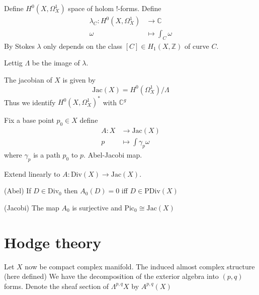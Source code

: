 Define $H^0 ( X, \Omega_X ^ 1) $ space of holom !-forms.
Define 
\begin{align}
    \lambda _ C : H^0 ( X, \Omega_X ^1 ) & \rightarrow  \mathbb{C} \\
    \omega & \mapsto \int _C \omega
\end{align}
By Stokes $\lambda$ only depends on the class $[C] \in H_1 (X, \mathbb{Z} ) $ of curve $C$. 

Lettig $ \Lambda$ be the image of $\lambda$.

\begin{definition}
The jacobian of $ X$ is given by 
    \begin{equation}
        \mathrm{Jac}(X) = H^0 (\Omega^1 _X )/ \Lambda
    \end{equation}
    Thus we identify $H^0 ( X, \Omega^1 _X) ^* $ with $ \mathbb{C} ^ g$
\end{definition}

\begin{definition}
    Fix a base point $ p_0 \in X $ define 
    \begin{align}
        A: X & \rightarrow \mathrm{Jac}(X) \\
        p & \mapsto \int \gamma_p \omega 
    \end{align}
    where $ \gamma_p $ is a path $p_0 $ to $p $. 
    Abel-Jacobi map.

    Extend linearly to $ A : \mathrm{Div}(X) \rightarrow \mathrm{Jac} (X) $.
\end{definition}

\begin{theorem}
    (Abel) If $D \in \mathrm{Div}_0 $ then $A_0 (D) = 0 $ iff $D \in \mathrm{PDiv}(X)$
\end{theorem}

\begin{theorem}
    (Jacobi) The map $A_0 $ is surjective and $\mathrm{Pic} _0 \cong \mathrm{Jac}(X)$ 
\end{theorem}


\section{Hodge theory } %

Let $X$ now be compact complex manifold. 
The induced almost complex structure (here defined) 
We have the decomposition of the exterior algebra into $(p,q)$ forms. 
Denote the sheaf section of $ \Lambda^{p,q} X$ by $ A^{p,q} (X) $ 


